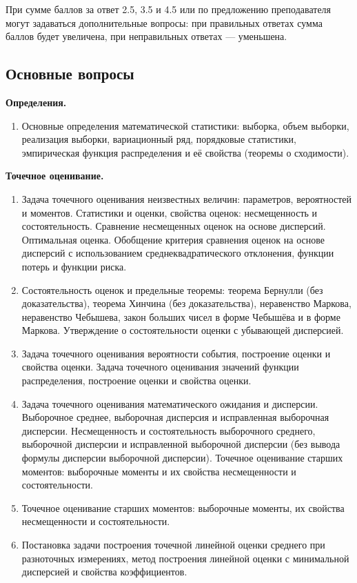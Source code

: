 \documentclass[a4paper,12pt]{article}
\newcommand{\theme}[1]{\hfil \textbf{#1} \hfil}
\begin{document}
При сумме баллов за ответ 2.5, 3.5 и 4.5 или по предложению преподавателя могут задаваться дополнительные вопросы: при правильных ответах сумма баллов будет
увеличена, при неправильных ответах --- уменьшена.

\pagebreak

\subsection{Основные вопросы}

\theme{Определения.}
\begin{enumerate}
    \item \label{def} Основные определения математической статистики: выборка, объем выборки, реализация выборки, вариационный ряд, порядковые статистики, эмпирическая функция распределения и её свойства (теоремы о сходимости).
\end{enumerate}

\theme{Точечное оценивание.}
\begin{enumerate}[resume]
    \item \label{est:pro} Задача точечного оценивания неизвестных величин: параметров, вероятностей и моментов. Статистики и оценки, свойства оценок: несмещенность и состоятельность. Сравнение несмещенных оценок на основе дисперсий. Оптимальная оценка. Обобщение критерия сравнения оценок на основе дисперсий с использованием среднеквадратического отклонения, функции потерь и функции риска.
    \item \label{est:lt} Состоятельность оценок и предельные теоремы: теорема Бернулли (без доказательства), теорема Хинчина (без доказательства), неравенство Маркова, неравенство Чебышева, закон больших чисел в форме Чебышёва и в форме Маркова. Утверждение о состоятельности оценки с убывающей дисперсией.
    \item \label{est:pt-cdf} Задача точечного оценивания вероятности события, построение оценки и свойства оценки. Задача точечного оценивания значений функции распределения, построение оценки и свойства оценки.
    \item \label{est:ev} Задача точечного оценивания математического ожидания и дисперсии. Выборочное среднее, выборочная дисперсия и исправленная выборочная дисперсии. Несмещенность и состоятельность выборочного среднего, выборочной дисперсии и исправленной выборочной дисперсии (без вывода формулы дисперсии выборочной дисперсии). Точечное оценивание старших моментов: выборочные моменты и их свойства несмещенности и состоятельности.
    \item \label{est:hom} Точечное оценивание старших моментов: выборочные моменты, их свойства несмещенности и состоятельности.
    \item \label{est:lin} Постановка задачи построения точечной линейной оценки среднего при разноточных измерениях, метод построения линейной оценки с минимальной дисперсией и свойства коэффициентов.
\end{enumerate}
\end{document}
